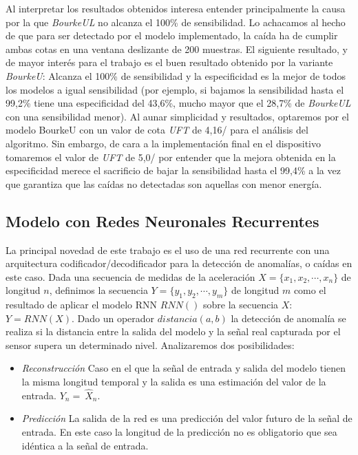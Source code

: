 Al interpretar los resultados obtenidos interesa entender principalmente la causa por la que \textit{BourkeUL} no alcanza el 100\% de sensibilidad. Lo achacamos al hecho de que para ser detectado por el modelo implementado, la caída ha de cumplir ambas cotas en una ventana deslizante de 200 muestras. El siguiente resultado, y de mayor interés para el trabajo es el buen resultado obtenido por la variante \textit{BourkeU}: Alcanza el 100\% de sensibilidad y la especificidad es la mejor de todos los modelos a igual sensibilidad (por ejemplo, si bajamos la sensibilidad hasta el 99,2\% tiene una especificidad del 43,6\%, mucho mayor que el 28,7\% de \textit{BourkeUL} con una sensibilidad menor). Al aunar simplicidad y resultados, optaremos por el modelo BourkeU con un valor de cota \textit{UFT} de 4,16\g/ para el análisis del algoritmo. Sin embargo, de cara a la implementación final en el dispositivo tomaremos el valor de \textit{UFT} de 5,0\g/ por entender que la mejora obtenida en la especificidad merece el sacrificio de bajar la sensibilidad hasta el 99,4\% a la vez que garantiza que las caídas no detectadas son aquellas con menor energía.

\subsection{Modelo con Redes Neuronales Recurrentes}\label{sub:imp:model:rnn}

La principal novedad de este trabajo es el uso de una red recurrente con una arquitectura codificador/decodificador para la detección de anomalías, o caídas en este caso. Dada una secuencia de medidas de la aceleración $X=\{x_1,x_2,\cdots,x_n\}$ de longitud $n$, definimos la secuencia $Y=\{y_1, y_2, \cdots,y_m\}$ de longitud $m$ como el resultado de aplicar el modelo RNN $RNN()$ sobre la secuencia $X$: $Y=RNN(X)$. Dado un operador $distancia(a,b)$ la detección de anomalía se realiza si la distancia entre la salida del modelo y la señal real capturada por el sensor supera un determinado nivel. Analizaremos dos posibilidades:
\begin{itemize}
  \item \textsl{Reconstrucción} Caso en el que la señal de entrada y salida del modelo tienen la misma longitud temporal y la salida es una estimación del valor de la entrada. $Y_n =\ \hat{X}_n$.
  \item \textsl{Predicción} La salida de la red es una predicción del valor futuro de la señal de entrada. En este caso la longitud de la predicción no es obligatorio que sea idéntica a la señal de entrada.
\end{itemize}

